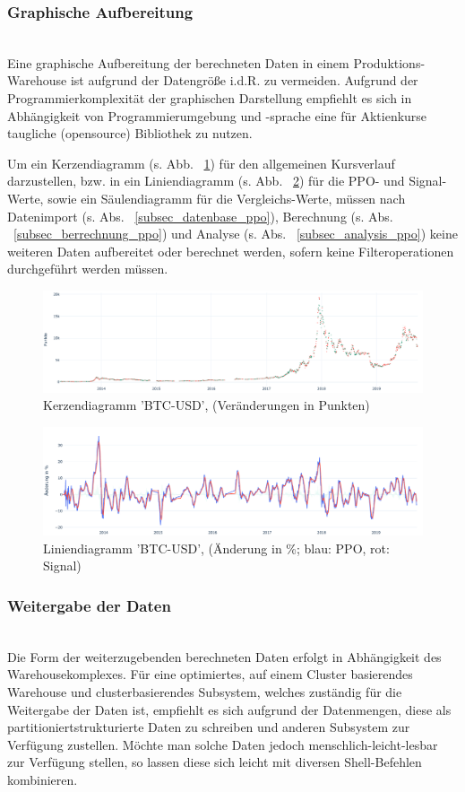 \subsubsection{Graphische Aufbereitung}~\\
Eine graphische Aufbereitung der berechneten Daten in einem Produktions-Warehouse ist aufgrund der Datengröße i.d.R. zu vermeiden. Aufgrund der Programmierkomplexität der graphischen Darstellung empfiehlt es sich in Abhängigkeit von Programmierumgebung und -sprache eine für Aktienkurse taugliche (opensource) Bibliothek zu nutzen. 

Um ein Kerzendiagramm (s. Abb. ~\ref{graph_btcusd_ppo_2}) für den allgemeinen Kursverlauf darzustellen, bzw. in ein Liniendiagramm (s. Abb. ~\ref{graph_btcusd_ppo_1}) für die PPO- und Signal-Werte, sowie ein Säulendiagramm für die Vergleichs-Werte, müssen nach Datenimport (s. Abs. ~\ref{subsec_datenbase_ppo}), Berechnung (s. Abs. ~\ref{subsec_berrechnung_ppo}) und Analyse (s. Abs. ~\ref{subsec_analysis_ppo}) keine weiteren Daten aufbereitet oder berechnet werden, sofern keine Filteroperationen durchgeführt werden müssen.

\begin{figure}[!htb]
\includegraphics[width=.5\textwidth,keepaspectratio]{ppo/graph_btcusd_ppo_2}
\caption{Kerzendiagramm 'BTC-USD', (Veränderungen in Punkten)}
\label{graph_btcusd_ppo_2}
\end{figure}

\begin{figure}[!htb]
\includegraphics[width=.5\textwidth,keepaspectratio]{ppo/graph_btcusd_ppo_1}
\caption{Liniendiagramm 'BTC-USD', (Änderung in \%; blau: PPO, rot: Signal)}
\label{graph_btcusd_ppo_1}
\end{figure}

\subsubsection{Weitergabe der Daten}~\\
Die Form der weiterzugebenden berechneten Daten erfolgt in Abhängigkeit des Warehousekomplexes. Für eine optimiertes, auf einem Cluster basierendes Warehouse und clusterbasierendes Subsystem, welches zuständig für die Weitergabe der Daten ist, empfiehlt es sich aufgrund der Datenmengen, diese als partitioniertstrukturierte Daten zu schreiben und anderen Subsystem zur Verfügung zustellen. Möchte man solche Daten jedoch menschlich-leicht-lesbar zur Verfügung stellen, so lassen diese sich leicht mit diversen Shell-Befehlen kombinieren.

